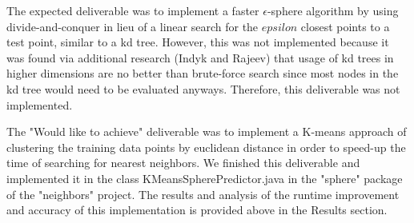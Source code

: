 \documentclass[11pt,letterpaper]{article}
\begin{document}
The expected deliverable was to implement a faster $\epsilon$-sphere algorithm by using divide-and-conquer in lieu of a linear search for the $epsilon$ closest points to a test point, similar to a kd tree. However, this was not implemented because it was found via additional research (Indyk and Rajeev) that usage of kd trees in higher dimensions are no better than brute-force search since most nodes in the kd tree would need to be evaluated anyways. Therefore, this deliverable was not implemented.

The "Would like to achieve" deliverable was to implement a K-means approach of clustering the training data points by euclidean distance in order to speed-up the time of searching for nearest neighbors.  We finished this deliverable and implemented it in the class KMeansSpherePredictor.java in the "sphere" package of the "neighbors" project. The results and analysis of the runtime improvement and accuracy of this implementation is provided above in the Results section.
\end{document}
